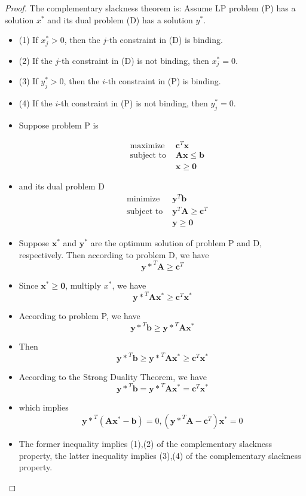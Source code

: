 \documentclass{article}
\newcommand{\<}{
    \langle}
\renewcommand{\>}{
    \rangle}
\begin{document}
{\begin{proof}
    The complementary slackness theorem is: Assume LP problem (P) has a solution $x^*$ and its dual problem (D) has a solution $y^*$.
		\begin{itemize}
			\item (1) If $x^{*}_j > 0$, then the $j$-th constraint in (D) is binding.
			\item (2) If the $j$-th constraint in (D) is not binding, then $x^{*}_j = 0$.
			\item (3) If $y^{*}_j > 0$, then the $i$-th constraint in (P) is binding.
			\item (4) If the $i$-th constraint in (P) is not binding, then $y^{*}_j = 0$.
			\item Suppose problem P is

			$$\begin{aligned}
			&\text { maximize } &\mathbf{c}^{T}\mathbf{x}\\
			&\text { subject to }& \mathbf{Ax}\leq \mathbf{b}\\
			& & \mathbf{x\geq 0}
			\end{aligned}$$

			\item and its dual problem D
			$$\begin{aligned}
			&\text { minimize } &\mathbf{y}^{T}\mathbf{b}\\
			&\text { subject to }& \mathbf{y}^{T}\mathbf{A}\geq \mathbf{c}^T\\
			& & \mathbf{y\geq 0}
			\end{aligned}$$

			\item Suppose $\mathbf{x^*}$ and $\mathbf{y^*}$ are the optimum solution of problem P and D, respectively. Then according to problem D, we have
			$$
			\mathbf{y*}^{T}\mathbf{A}\geq \mathbf{c}^T
			$$
			\item Since $\mathbf{x^*\geq 0}$, multiply $x^*$, we have
			$$
			\mathbf{y*}^{T}\mathbf{Ax^*}\geq \mathbf{c}^T\mathbf{x^*}
			$$
			\item According to problem P, we have
			$$
			\mathbf{y*}^{T}\mathbf{b} \geq \mathbf{y*}^{T}\mathbf{Ax^*}
			$$
			\item Then 
			$$
			\mathbf{y*}^{T}\mathbf{b} \geq \mathbf{y*}^{T}\mathbf{Ax^*}\geq \mathbf{c}^T\mathbf{x^*}
			$$
			\item According to the Strong Duality Theorem, we have
			$$
			\mathbf{y*}^{T}\mathbf{b} = \mathbf{y*}^{T}\mathbf{Ax^*} = \mathbf{c}^T\mathbf{x^*}
			$$
			\item which implies
			$$
			\mathbf{y*}^{T}\mathbf{(Ax^*-b)}=0,(\mathbf{y*}^{T}\mathbf{A}-\mathbf{c}^T)\mathbf{x^*}=0
			$$
			\item The former inequality implies (1),(2) of the complementary slackness property, the latter inequality implies (3),(4) of the complementary slackness property.
		\end{itemize}
\end{proof}
\newpage




}
\end{document}
